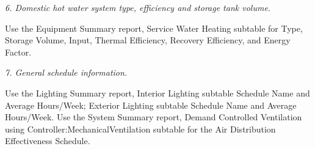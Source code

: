 \emph{6. Domestic hot water system type, efficiency and storage tank volume.}

Use the Equipment Summary report, Service Water Heating subtable for Type, Storage Volume, Input, Thermal Efficiency, Recovery Efficiency, and Energy Factor.

\emph{7. General schedule information.}

Use the Lighting Summary report, Interior Lighting subtable Schedule Name and Average Hours/Week; Exterior Lighting subtable Schedule Name and Average Hours/Week. Use the System Summary report, Demand Controlled Ventilation using Controller:MechanicalVentilation subtable for the Air Distribution Effectiveness Schedule.
